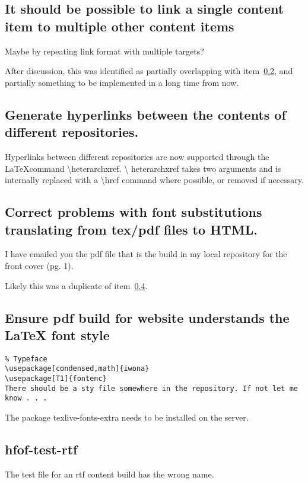 \documentclass[12pt]{article}
\begin{document}
\subsection{It should be possible to link a single content item to multiple other content items}
Maybe by repeating link format with multiple targets?

After discussion, this was identified as partially overlapping with
item~\ref{sec:gener-hyperl-betw}, and partially something to be
implemented in a long time from now.

\subsection{Generate hyperlinks between the contents of different repositories.}
\label{sec:gener-hyperl-betw}
Hyperlinks between different repositories are now supported through
the \LaTeX command \textbackslash heterarchxref.  \textbackslash
heterarchxref takes two arguments and is internally replaced with a
\textbackslash href command where possible, or removed if necessary.


\subsection{Correct problems with font substitutions translating from tex/pdf files to HTML.}
\label{sec:corr-probl-with}
I have emailed you the pdf file that is the build in my local repository for the front cover (pg. 1). 

Likely this was a duplicate of item~\ref{sec:ensure-pdf-build}.


\subsection{Ensure pdf build for website understands the LaTeX font style}
\label{sec:ensure-pdf-build}
\begin{verbatim}
% Typeface
\usepackage[condensed,math]{iwona}
\usepackage[T1]{fontenc}
There should be a sty file somewhere in the repository. If not let me know . . .
\end{verbatim}

The package texlive-fonts-extra needs to be installed on the server.


\subsection{hfof-test-rtf}

The test file for an rtf content build has the wrong name.
\end{document}
